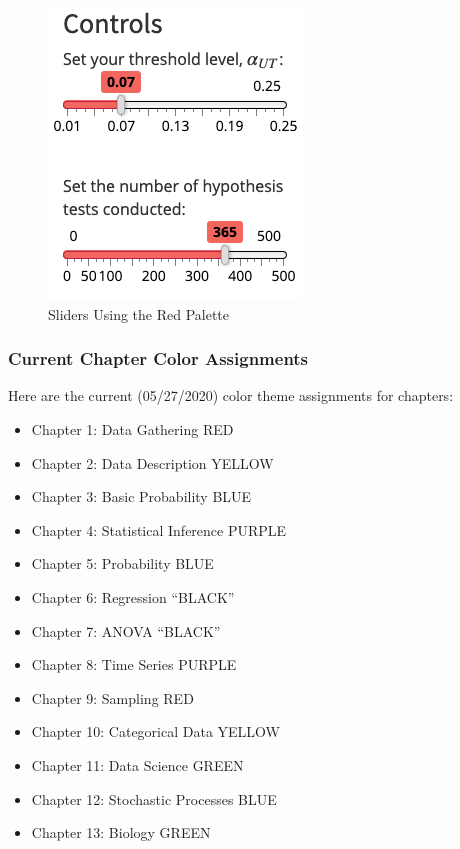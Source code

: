 \documentclass[
]{book}
\providecommand{\tightlist}{%
  \setlength{\itemsep}{0pt}\setlength{\parskip}{0pt}}
\begin{document}
\begin{figure}

{\centering \includegraphics{images/redSliders} 

}

\caption{Sliders Using the Red Palette}\label{fig:redAction3}
\end{figure}

\hypertarget{chapterColor}{%
\subsubsection{Current Chapter Color Assignments}\label{chapterColor}}

Here are the current (05/27/2020) color theme assignments for chapters:

\begin{itemize}
\tightlist
\item
  Chapter 1: Data Gathering RED
\item
  Chapter 2: Data Description YELLOW
\item
  Chapter 3: Basic Probability BLUE
\item
  Chapter 4: Statistical Inference PURPLE
\item
  Chapter 5: Probability BLUE
\item
  Chapter 6: Regression ``BLACK''
\item
  Chapter 7: ANOVA ``BLACK''
\item
  Chapter 8: Time Series PURPLE
\item
  Chapter 9: Sampling RED
\item
  Chapter 10: Categorical Data YELLOW
\item
  Chapter 11: Data Science GREEN
\item
  Chapter 12: Stochastic Processes BLUE
\item
  Chapter 13: Biology GREEN
\end{itemize}
\end{document}
